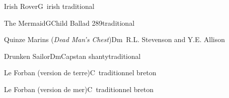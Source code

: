 \begin{song}{Irish Rover}{G}{~}{irish traditional}{}{}
	
\end{song}

\begin{song}{The Mermaid}{G}{Child Ballad 289}{traditional}{}{}
	
\end{song}

\begin{song}{Quinze Marins (\textit{Dead Man's Chest})}{Dm}{~}{R.L. Stevenson and Y.E. Allison}{}{}
	
\end{song}

\begin{song}{Drunken Sailor}{Dm}{Capstan shanty}{traditional}{}{}
	
\end{song}

\begin{song}{Le Forban (version de terre)}{C}{~}{traditionnel breton}{}{}
	
\end{song}
	
\begin{song}{Le Forban (version de mer)}{C}{~}{traditionnel breton}{}{}
	
\end{song}